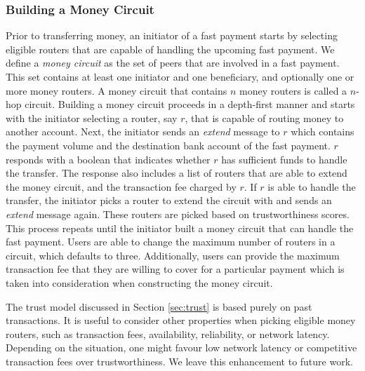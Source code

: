 \subsubsection*{Building a Money Circuit}
Prior to transferring money, an initiator of a fast payment starts by selecting eligible routers that are capable of handling the upcoming fast payment.
We define a \emph{money circuit} as the set of peers that are involved in a fast payment.
This set contains at least one initiator and one beneficiary, and optionally one or more money routers.
A money circuit that contains $ n $ money routers is called a $n$-hop circuit.
Building a money circuit proceeds in a depth-first manner and starts with the initiator selecting a router, say $ r $, that is capable of routing money to another account.
Next, the initiator sends an \emph{extend} message to $ r $ which contains the payment volume and the destination bank account of the fast payment.
$ r $ responds with a boolean that indicates whether $ r $ has sufficient funds to handle the transfer.
The response also includes a list of routers that are able to extend the money circuit, and the transaction fee charged by $ r $.
If $ r $ is able to handle the transfer, the initiator picks a router to extend the circuit with and sends an \emph{extend} message again.
These routers are picked based on trustworthiness scores.
This process repeats until the initiator built a money circuit that can handle the fast payment. %
Users are able to change the maximum number of routers in a circuit, which defaults to three.
Additionally, users can provide the maximum transaction fee that they are willing to cover for a particular payment which is taken into consideration when constructing the money circuit.

The trust model discussed in Section \ref{sec:trust} is based purely on past transactions.
It is useful to consider other properties when picking eligible money routers, such as transaction fees, availability, reliability, or network latency. 
Depending on the situation, one might favour low network latency or competitive transaction fees over trustworthiness.
We leave this enhancement to future work.


